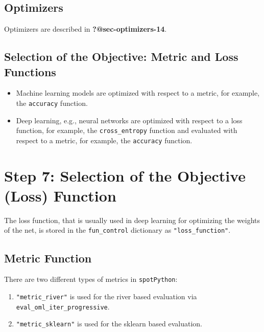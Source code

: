 \documentclass[
  letterpaper,
  DIV=11,
  numbers=noendperiod]{scrreprt}
\providecommand{\tightlist}{%
  \setlength{\itemsep}{0pt}\setlength{\parskip}{0pt}}\usepackage{longtable,booktabs,array}
\begin{document}
\hypertarget{sec-optimizers-16}{%
\subsection{Optimizers}\label{sec-optimizers-16}}

Optimizers are described in \textbf{?@sec-optimizers-14}.

\hypertarget{selection-of-the-objective-metric-and-loss-functions}{%
\subsection{Selection of the Objective: Metric and Loss
Functions}\label{selection-of-the-objective-metric-and-loss-functions}}

\begin{itemize}
\tightlist
\item
  Machine learning models are optimized with respect to a metric, for
  example, the \texttt{accuracy} function.
\item
  Deep learning, e.g., neural networks are optimized with respect to a
  loss function, for example, the \texttt{cross\_entropy} function and
  evaluated with respect to a metric, for example, the \texttt{accuracy}
  function.
\end{itemize}

\hypertarget{step-7-selection-of-the-objective-loss-function-1}{%
\section{Step 7: Selection of the Objective (Loss)
Function}\label{step-7-selection-of-the-objective-loss-function-1}}

The loss function, that is usually used in deep learning for optimizing
the weights of the net, is stored in the \texttt{fun\_control}
dictionary as \texttt{"loss\_function"}.

\hypertarget{metric-function}{%
\subsection{Metric Function}\label{metric-function}}

There are two different types of metrics in \texttt{spotPython}:

\begin{enumerate}
\def\labelenumi{\arabic{enumi}.}
\tightlist
\item
  \texttt{"metric\_river"} is used for the river based evaluation via
  \texttt{eval\_oml\_iter\_progressive}.
\item
  \texttt{"metric\_sklearn"} is used for the sklearn based evaluation.
\end{enumerate}
\end{document}
